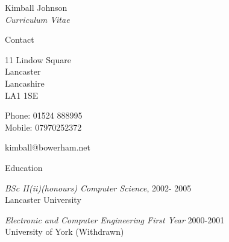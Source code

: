 \documentclass[10pt]{article}
\begin{document}
\newlength{\oldcvlabelwidth}
\renewcommand*{\cvbibname}{}

\begin{cv}{Kimball Johnson\\{\large \itshape Curriculum Vitae}}

\begin{cvlist}{Contact}
	\item
	11 Lindow Square\\
	Lancaster\\
	Lancashire\\
	LA1 1SE
	\item Phone: 01524 888995\\
	Mobile: 07970252372
	\item kimball@bowerham.net
\end{cvlist}

\begin{cvlist}{Education}
	\item \emph{BSc II(ii)(honours) Computer Science}, 2002- 2005\\
	Lancaster University
    \item \emph{Electronic and Computer Engineering First Year} 2000-2001\\
    University of York (Withdrawn)
\end{cvlist}


\end{cv}
\end{document}
